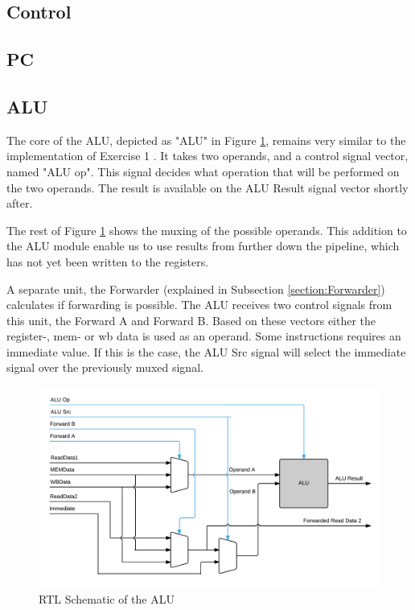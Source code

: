 \subsection{Control}

\subsection{PC}

\subsection{ALU}
The core of the ALU, depicted as "ALU" in Figure \ref{fig:ALU}, remains very similar to the implementation of Exercise 1 \cite{ex1report}. It takes two operands, and a control signal vector, named "ALU op". This signal decides what operation that will be performed on the two operands. The result is available on the ALU Result signal vector shortly after.

The rest of Figure \ref{fig:ALU} shows the muxing of the possible operands. This addition to the ALU module enable us to use results from further down the pipeline, which has not yet been written to the registers.

A separate unit, the Forwarder (explained in Subsection \ref{section:Forwarder}) calculates if forwarding is possible. The ALU receives two control signals from this unit, the Forward A and Forward B.
Based on these vectors either the register-, mem- or wb data is used as an operand.
Some instructions requires an immediate value. If this is the case, the ALU Src signal will select the immediate signal over the previously muxed signal.


\begin{figure}[h!]
    \includegraphics[width=\linewidth]{img/ALU.png}
    \caption{RTL Schematic of the ALU}
    \label{fig:ALU}
\end{figure}

